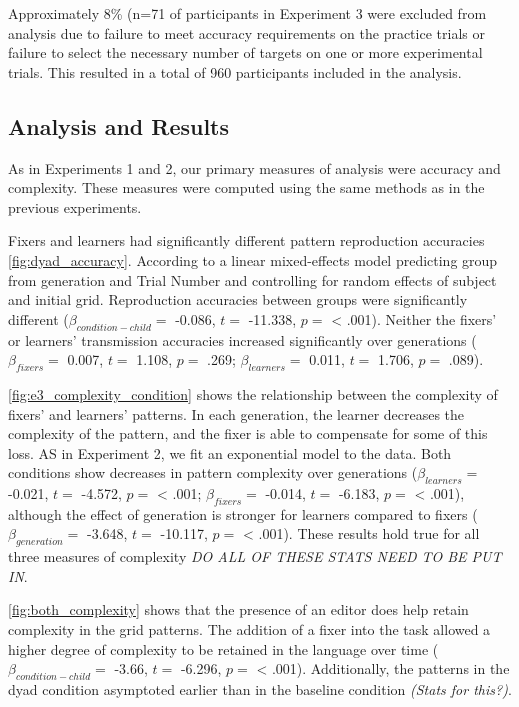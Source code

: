 \documentclass[10pt, letterpaper]{article}
\begin{document}
Approximately 8\% (n=71 of participants in Experiment 3 were excluded
from analysis due to failure to meet accuracy requirements on the
practice trials or failure to select the necessary number of targets on
one or more experimental trials. This resulted in a total of 960
participants included in the analysis.

\subsection{Analysis and Results}\label{analysis-and-results}

As in Experiments 1 and 2, our primary measures of analysis were
accuracy and complexity. These measures were computed using the same
methods as in the previous experiments.

Fixers and learners had significantly different pattern reproduction
accuracies \ref{fig:dyad_accuracy}. According to a linear mixed-effects
model predicting group from generation and Trial Number and controlling
for random effects of subject and initial grid. Reproduction accuracies
between groups were significantly different
(\(\beta_{condition-child} =\) -0.086, \(t =\) -11.338, \(p =\)
\textless{} .001). Neither the fixers' or learners' transmission
accuracies increased significantly over generations
(\(\beta_{fixers} =\) 0.007, \(t =\) 1.108, \(p =\) .269;
\(\beta_{learners} =\) 0.011, \(t =\) 1.706, \(p =\) .089).

\ref{fig:e3_complexity_condition} shows the relationship between the
complexity of fixers' and learners' patterns. In each generation, the
learner decreases the complexity of the pattern, and the fixer is able
to compensate for some of this loss. AS in Experiment 2, we fit an
exponential model to the data. Both conditions show decreases in pattern
complexity over generations (\(\beta_{learners} =\) -0.021, \(t =\)
-4.572, \(p =\) \textless{} .001; \(\beta_{fixers} =\) -0.014, \(t =\)
-6.183, \(p =\) \textless{} .001), although the effect of generation is
stronger for learners compared to fixers (\(\beta_{generation} =\)
-3.648, \(t =\) -10.117, \(p =\) \textless{} .001). These results hold
true for all three measures of complexity \emph{DO ALL OF THESE STATS
NEED TO BE PUT IN}.

\ref{fig:both_complexity} shows that the presence of an editor does help
retain complexity in the grid patterns. The addition of a fixer into the
task allowed a higher degree of complexity to be retained in the
language over time (\(\beta_{condition-child} =\) -3.66, \(t =\) -6.296,
\(p =\) \textless{} .001). Additionally, the patterns in the dyad
condition asymptoted earlier than in the baseline condition \emph{(Stats
for this?)}.
\end{document}
